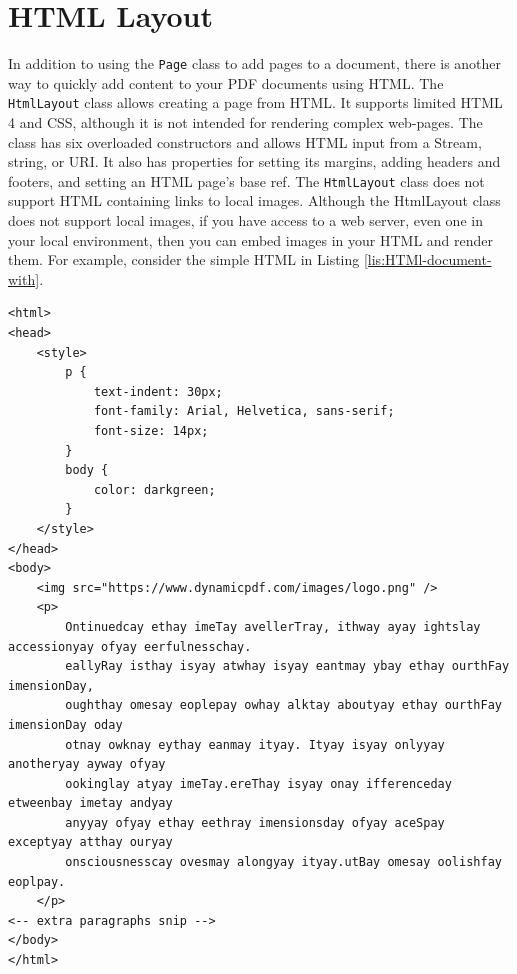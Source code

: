 \documentclass[american]{tufte-book}
\numberwithin{equation}{section}
\numberwithin{figure}{section}
\begin{document}
\section{HTML Layout}

In addition to using the \texttt{Page} class to add pages to a document, there is another way to quickly add content to your PDF documents using
HTML. The \texttt{HtmlLayout} class allows creating a page from HTML.
It supports limited HTML 4 and CSS, although it is not intended for
rendering complex web-pages. The class has six overloaded constructors and allows HTML input from
a Stream, string, or URI. It also has properties for setting its margins,
adding headers and footers, and setting an HTML page's base ref. The
\texttt{HtmlLayout} class does not support HTML containing links to
local images. Although the HtmlLayout class does not support local
images, if you have access to a web server, even one in your local
environment, then you can embed images in your HTML and render them.
For example, consider the simple HTML in Listing \ref{lis:HTMl-document-with}.

\bgroup{}
\begin{lstlisting}[caption={HTMl document with simple CSS and image link.},label={lis:HTMl-document-with},basicstyle={\footnotesize\ttfamily},breaklines=true]
<html>
<head>
    <style>
        p {
            text-indent: 30px;
            font-family: Arial, Helvetica, sans-serif;
            font-size: 14px;
        }
        body {
            color: darkgreen;
        }
    </style>
</head>
<body>
    <img src="https://www.dynamicpdf.com/images/logo.png" />
    <p>
        Ontinuedcay ethay imeTay avellerTray, ithway ayay ightslay accessionyay ofyay eerfulnesschay.
        eallyRay isthay isyay atwhay isyay eantmay ybay ethay ourthFay imensionDay,
        oughthay omesay eoplepay owhay alktay aboutyay ethay ourthFay imensionDay oday
        otnay owknay eythay eanmay ityay. Ityay isyay onlyyay anotheryay ayway ofyay
        ookinglay atyay imeTay.ereThay isyay onay ifferenceday etweenbay imetay andyay
        anyyay ofyay ethay eethray imensionsday ofyay aceSpay exceptyay atthay ouryay
        onsciousnesscay ovesmay alongyay ityay.utBay omesay oolishfay eoplpay.
    </p>
<-- extra paragraphs snip -->
</body>
</html>
\end{lstlisting}
\leavevmode\egroup
\end{document}
